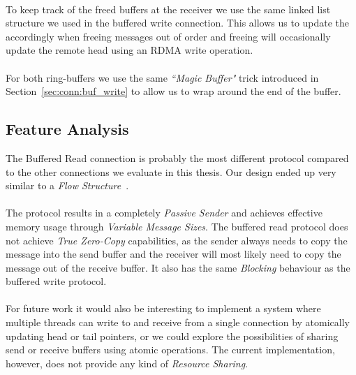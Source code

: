 \paragraph{} To keep track of the freed buffers at the receiver we use the same linked list structure we used in the buffered
write connection. This allows us to update the  accordingly when freeing messages out of order and freeing will
occasionally update the remote head using an RDMA write operation.

\paragraph{} For both ring-buffers we use the same \emph{``Magic Buffer"} trick introduced in Section~\ref{sec:conn:buf_write} to 
allow us to wrap around the end of the buffer.

\subsection{Feature Analysis}
The Buffered Read connection is probably the most different protocol compared to the other connections we evaluate in this
thesis. Our design ended up very similar to a \emph{Flow Structure}~\cite{sharma2020design}.

\paragraph{} The protocol results in a completely \emph{Passive Sender} and achieves effective memory usage through \emph{Variable Message Sizes}.
The buffered read protocol does not achieve \emph{True Zero-Copy} capabilities, as the sender always needs to copy the 
message into the send buffer and the receiver will most likely need to copy the message out of the receive buffer. It also
has the same \emph{Blocking} behaviour as the buffered write protocol.


\paragraph{} For future work it would also be interesting to implement a system where multiple threads can write to and receive 
from a single  connection by atomically updating head or tail pointers, or we could explore the possibilities of sharing send or
receive buffers using atomic operations. The current implementation, however, does not provide any kind of \emph{Resource Sharing}.
